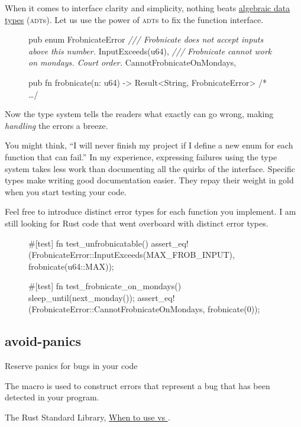 \documentclass{article}
\begin{document}
When it comes to interface clarity and simplicity, nothing beats \href{https://en.wikipedia.org/wiki/Algebraic_data_type}{algebraic data types} (\textsc{adt}s).
Let us use the power of \textsc{adt}s to fix the  function interface.

\begin{figure}
\begin{code}[good]
pub enum FrobnicateError {
  \emph{/// Frobnicate does not accept inputs above this number.}
  InputExceeds(u64),
  \emph{/// Frobnicate cannot work on mondays. Court order.}
  CannotFrobnicateOnMondays,
}

pub fn frobnicate(n: u64) -> Result<String, FrobnicateError> { /* \ldots  */ }
\end{code}
\end{figure}


Now the type system tells the readers what exactly can go wrong, making \emph{handling} the errors a breeze.

You might think, ``I will never finish my project if I define a new enum for each function that can fail.''
In my experience, expressing failures using the type system takes less work than documenting all the quirks of the interface.
Specific types make writing good documentation easier.
They repay their weight in gold when you start testing your code.

Feel free to introduce distinct error types for each function you implement.
I am still looking for Rust code that went overboard with distinct error types.

\begin{figure}
\begin{code}[good]
#[test]
fn test_unfrobnicatable() {
  assert_eq!(FrobnicateError::InputExceeds(MAX_FROB_INPUT), frobnicate(u64::MAX));
}

#[test]
fn test_frobnicate_on_mondays() {
  sleep_until(next_monday());
  assert_eq!(FrobnicateError::CannotFrobnicateOnMondays, frobnicate(0));
}
\end{code}
\end{figure}

\subsection{avoid-panics}{Reserve panics for bugs in your code}
\epigraph{
  The  macro is used to construct errors that represent a bug that has been detected in your program. 
}{The Rust Standard Library, \href{https://doc.rust-lang.org/std/macro.panic.html#when-to-use-panic-vs-result}{When to use  vs }.}
\end{document}

